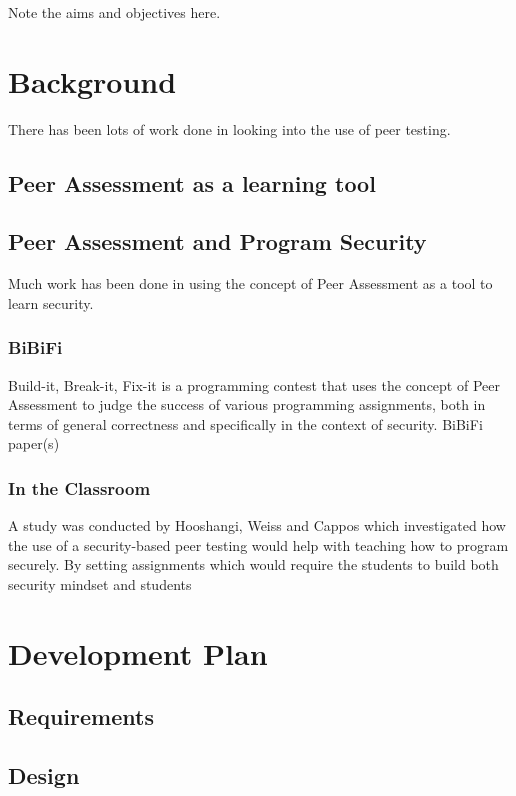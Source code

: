 \documentclass[a4paper,11pt]{report}
\begin{document}
Note the aims and objectives here.

\chapter{Background}
There has been lots of work done in looking into the use of peer testing.
\section{Peer Assessment as a learning tool}

\section{Peer Assessment and Program Security}
Much work has been done in using the concept of Peer Assessment as a tool to learn security.
\subsection{BiBiFi}
Build-it, Break-it, Fix-it is a programming contest that uses the concept of Peer Assessment to judge the success of various programming assignments, both in terms of general correctness and specifically in the context of security.
BiBiFi paper(s)\\


\subsection{In the Classroom}
A study was conducted by Hooshangi, Weiss and Cappos \cite{the paper} which investigated how the use of a security-based peer testing would help with teaching how to program securely. By setting assignments which would require the students to build both 
security mindset and students

\section{}


\chapter{Development Plan}

\section{Requirements}

\section{Design}
\end{document}
